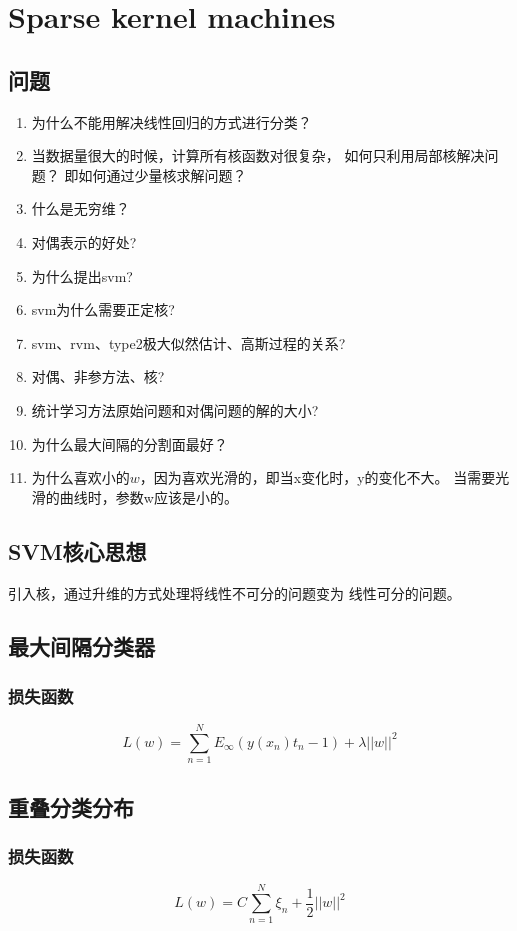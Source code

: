\chapter{Sparse kernel machines}
\section{问题}
\begin{enumerate}
\item 为什么不能用解决线性回归的方式进行分类？
\item 当数据量很大的时候，计算所有核函数对很复杂，
如何只利用局部核解决问题？ 即如何通过少量核求解问题？
\item 什么是无穷维？
\item 对偶表示的好处?
\item 为什么提出svm?
\item svm为什么需要正定核?
\item svm、rvm、type2极大似然估计、高斯过程的关系?
\item 对偶、非参方法、核?
\item 统计学习方法原始问题和对偶问题的解的大小?
\item 为什么最大间隔的分割面最好？
\item 为什么喜欢小的$w$，因为喜欢光滑的，即当x变化时，y的变化不大。
当需要光滑的曲线时，参数w应该是小的。
\end{enumerate}

\section{SVM核心思想}
引入核，通过升维的方式处理将线性不可分的问题变为
线性可分的问题。

\section{最大间隔分类器}
\subsection{损失函数}
\begin{equation}
L(w) = \sum_{n=1}^N E_\infty(y(x_n)t_n - 1) + \lambda||w||^2
\end{equation}
\section{重叠分类分布}

\subsection{损失函数}
\begin{equation}
L(w) = C\sum_{n=1}^N\xi_n + \frac{1}{2}||w||^2
\end{equation}

